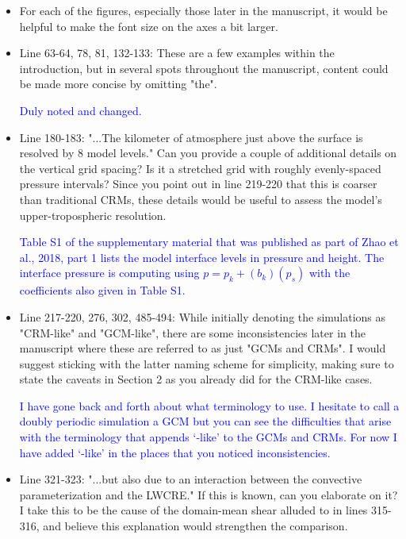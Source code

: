 \documentclass[draft]{agujournal2019}
\begin{document}
\begin{itemize}
  \item For each of the figures, especially those later in the manuscript, it would be helpful to make the font size on the axes a bit larger.
  
  \item Line 63-64, 78, 81, 132-133: These are a few examples within the introduction, but in several spots throughout the manuscript, content could be made more concise by omitting "the".  
  
  \textcolor{blue}{Duly noted and changed.}
  
  \item Line 180-183: "...The kilometer of atmosphere just above the surface is resolved by 8 model levels." Can you provide a couple of additional details on the vertical grid spacing? Is it a stretched grid with roughly evenly-spaced pressure intervals? Since you point out in line 219-220 that this is coarser than traditional CRMs, these details would be useful to assess the model's upper-tropospheric resolution.  
  
  \textcolor{blue}{Table S1 of the supplementary material that was published as part of Zhao et al., 2018, part 1 lists the model interface levels in pressure and height.  The interface pressure is computing using $p=p_k+(b_k)(p_s)$ with the coefficients also given in Table S1.}
  
  \item Line 217-220, 276, 302, 485-494: While initially denoting the simulations as "CRM-like" and "GCM-like", there are some inconsistencies later in the manuscript where these are referred to as just "GCMs and CRMs". I would suggest sticking with the latter naming scheme for simplicity, making sure to state the caveats in Section 2 as you already did for the CRM-like cases.  
  
  \textcolor{blue}{I have gone back and forth about what terminology to use.  I hesitate to call a doubly periodic simulation a GCM but you can see the difficulties that arise with the terminology that appends ‘-like’ to the GCMs and CRMs.  For now I have added ‘-like’ in the places that you noticed inconsistencies. }
  
  \item Line 321-323: "...but also due to an interaction between the convective parameterization and the LWCRE." If this is known, can you elaborate on it? I take this to be the cause of the domain-mean shear alluded to in lines 315-316, and believe this explanation would strengthen the comparison.
  

\end{itemize}
\end{document}
